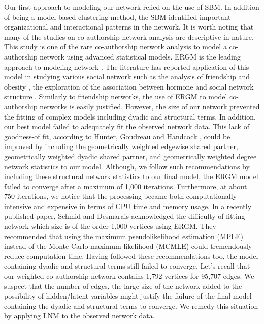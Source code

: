 Our first approach to modeling our network relied on the use of SBM. In addition of being a model based clustering method, the SBM identified important organizational and interactional patterns in the network. It is worth noting that many of the studies on co-authorship network analysis are descriptive in nature. This study is one of the rare co-authorship network analysis to model a co-authorship network using advanced statistical models. ERGM is the leading approach to modeling network \cite{schmid_exponential_2017}. The literature has reported application of this model in studying various social network such as the analysis of friendship and obesity \cite{valente_adolescent_2009,de_la_haye_obesity-related_2010}, the exploration of the association between hormone and social network structure \cite{kornienko_hormones_2014}. Similarly to friendship networks, the use of ERGM to model co-authorship networks is easily justified. However, the size of our network prevented the fitting of complex models including dyadic and structural terms. In addition, our best model failed to adequately fit the observed network data. This lack of goodness-of fit, according to Hunter, Goudreau and Handcock \cite{hunter_goodness_2008}, could be improved by including the geometrically weighted edgewise shared partner, geometrically weighted dyadic shared partner, and geometrically weighted degree network statistics to our model. Although, we follow such recommendations by including these structural network statistics to our final model, the ERGM model failed to converge after a maximum of 1,000 iterations. Furthermore, at about 750 iterations, we notice that the processing became both computationally intensive and expensive in terms of CPU time and memory usage.  In a recently published paper, Schmid and Desmarais \cite{schmid_exponential_2017} acknowledged the difficulty of fitting network which size is of the order 1,000 vertices using ERGM. They recommended that using the maximum pseudolikelihood estimation (MPLE) instead of the Monte Carlo maximum likelihood (MCMLE) could tremendously reduce computation time. Having followed these recommendations too, the model containing dyadic and structural terms still failed to converge. Let's recall that our weighted co-authorship network contains 1,792 vertices for 95,707 edges. We suspect that the number of edges, the large size of the network added to the possibility of hidden/latent variables might justify the failure of the final model containing the dyadic and structural terms to converge. We remedy this situation by applying LNM to the observed network data. \\
